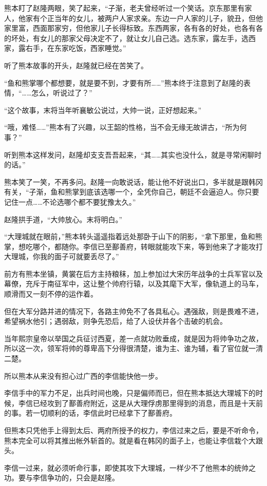 熊本盯了赵隆两眼，笑了起来，“子渐，老夫曾经听过一个笑话。京东那里有家人，他家有个正当年的女儿，被两户人家求亲。东边一户人家的儿子，貌丑，但他家里富，西面那家穷，但他家儿子长得标致。东西两家，各有各的好处，也各有各的坏处，有女儿的那家父母决定不了，就让女儿自己选。选东家，露左手，选西家，露右手，在东家吃饭，西家睡觉。”

听了熊本故事的开头，赵隆就已经在苦笑了。

“鱼和熊掌哪个都想要，就是要不到，才要有所……”熊本终于注意到了赵隆的表情，“……怎么，听说过了？”

“这个故事，末将当年听襄敏公说过，大帅一说，正好想起来。”

“哦，难怪……”熊本有了兴趣，以王韶的性格，当不会无缘无故讲古，“所为何事？”

听到熊本这样发问，赵隆却支支吾吾起来，“其……其实也没什么，就是寻常闲聊时的话。”

熊本笑了一笑，不再多问。赵隆一向敢说话，能让他不好说出口，多半就是跟韩冈有关，“子渐，鱼和熊掌到底该选哪一个，全凭你自己，朝廷不会逼迫人。你只要记住一点……不论选哪个都不要犹豫太久。”

赵隆拱手道，“大帅放心。末将明白。”

“大理城就在眼前，”熊本转头遥遥指着远处那卧于山下的阴影，“拿下那里，鱼和熊掌，想吃哪个，都随你。李信已至鄯善府，转眼就能攻下来，等到他来了才能攻打大理城，你我的面子可就要丢尽了。”

前方有熊本坐镇，黄裳在后方主持粮秣，加上参加过大宋历年战争的士兵军官以及幕僚，充斥于南征军中，这让整个帅府行辕，以及其麾下大军，像轨道上的马车，顺滑而又一刻不停的运作着。

但在大军分路并进的情况下，各路主帅免不了各具私心。遇强敌，则是畏难不进，希望祸水他引；遇弱敌，则争先恐后，给了人设伏并各个击破的机会。

当年熙宗皇帝以举国之兵征讨西夏，差一点就功败垂成，就是因为将帅争功之故，所以这一次，领军将帅的尊卑高下分得很清楚，谁为主、谁为辅，看了官位就一清二楚。

所以熊本从来没有担心过广西的李信能快他一步。

李信手中的军力不足，出兵时间也晚，只是偏师而已，但在熊本抵达大理城下的时候，李信已经攻到了鄯善府附近，这是从大理俘虏那里得到的消息，而且是十天前的事。若一切顺利的话，李信此时已经拿下了鄯善府。

但熊本只凭他手上得到太后、两府所授予的权力，李信过来之后，要是不听命令，熊本完全可以将其推出帐外斩首的。就是看在韩冈的面子上，也能让李信栽个大跟头。

李信一过来，就必须听命行事，即使其攻下大理城，一样少不了他熊本的统帅之功。要与李信争功的，只会是赵隆。

